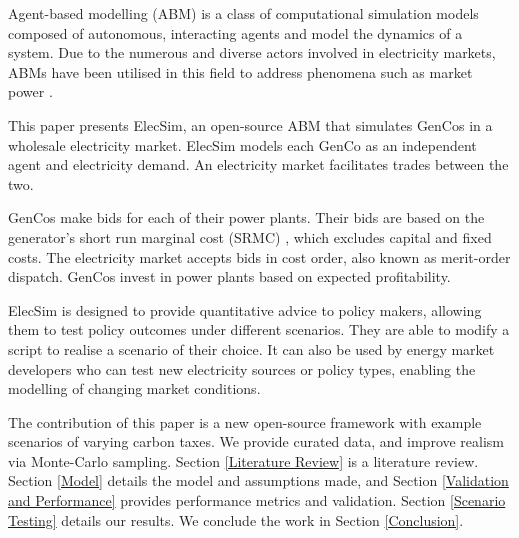Agent-based modelling (ABM) is a class of computational simulation models composed of autonomous, interacting agents and model the dynamics of a system. Due to the numerous and diverse actors involved in electricity markets, ABMs have been utilised in this field to address phenomena such as market power \cite{Ringler2016a}. 

This paper presents ElecSim, an open-source ABM that simulates GenCos in a wholesale electricity market. ElecSim models each GenCo as an independent agent and electricity demand. An electricity market facilitates trades between the two. 

GenCos make bids for each of their power plants. Their bids are based on the generator's short run marginal cost (SRMC) \cite{Perloff2012}, which excludes capital and fixed costs. The electricity market accepts bids in cost order, also known as merit-order dispatch. GenCos invest in power plants based on expected profitability.	

ElecSim is designed to provide quantitative advice to policy makers, allowing them to test policy outcomes under different scenarios. They are able to modify a script to realise a scenario of their choice. It can also be used by energy market developers who can test new electricity sources or policy types, enabling the modelling of changing market conditions.







The contribution of this paper is a new open-source framework with example scenarios of varying carbon taxes. We provide curated data, and improve realism via Monte-Carlo sampling. Section \ref{Literature Review} is a literature review. Section \ref{Model} details the model and assumptions made, and Section \ref{Validation and Performance} provides performance metrics and validation. Section \ref{Scenario Testing} details our results. We conclude the work in Section \ref{Conclusion}.



